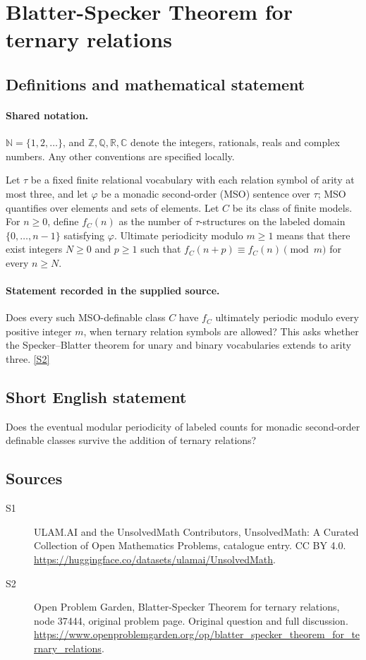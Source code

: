 \documentclass[11pt]{article}
\newcommand{\sref}[2]{\hyperlink{source:#1:#2}{[S#2]}}
\begin{document}
\section{Blatter-Specker Theorem for ternary relations}\label{statement}

\subsection{Definitions and mathematical statement}

\paragraph{Shared notation.}$\mathbb N=\{1,2,\ldots\}$, and $\mathbb Z,\mathbb Q,\mathbb R,\mathbb C$ denote the integers, rationals, reals and complex numbers. Any other conventions are specified locally.


Let $\tau$ be a fixed finite relational vocabulary with each relation symbol of arity at most three, and let $\varphi$ be a monadic second-order (MSO) sentence over $\tau$; MSO quantifies over elements and sets of elements. Let $C$ be its class of finite models. For $n\geq0$, define $f_C(n)$ as the number of $\tau$-structures on the labeled domain $\{0,\ldots,n-1\}$ satisfying $\varphi$. Ultimate periodicity modulo $m\geq1$ means that there exist integers $N\geq0$ and $p\geq1$ such that $f_C(n+p)\equiv f_C(n)\pmod m$ for every $n\geq N$.
\paragraph{Statement recorded in the supplied source.}
Does every such MSO-definable class $C$ have $f_C$ ultimately periodic modulo every positive integer $m$, when ternary relation symbols are allowed? This asks whether the Specker--Blatter theorem for unary and binary vocabularies extends to arity three. \sref{statement}{2}
\subsection{Short English statement}
Does the eventual modular periodicity of labeled counts for monadic second-order definable classes survive the addition of ternary relations?
\subsection{Sources}
\begin{description}
\item[\hypertarget{source:statement:1}{S1}] ULAM.AI and the UnsolvedMath Contributors, UnsolvedMath: A Curated Collection of Open Mathematics Problems, catalogue entry. CC BY 4.0. \url{https://huggingface.co/datasets/ulamai/UnsolvedMath}.
\item[\hypertarget{source:statement:2}{S2}] Open Problem Garden, Blatter-Specker Theorem for ternary relations, node 37444, original problem page. Original question and full discussion. \url{https://www.openproblemgarden.org/op/blatter_specker_theorem_for_ternary_relations}.

\end{description}
\label{end:statement}
\end{document}
